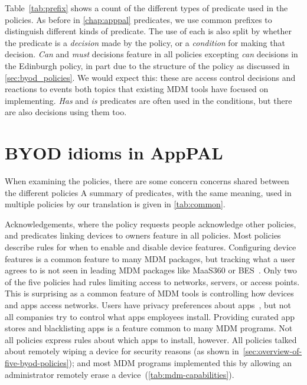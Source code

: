\documentclass[thesis.tex]{subfiles}
\begin{document}
Table~\ref{tab:prefix} shows a count of the different types of
predicate used in the policies.  As before in \autoref{chap:apppal}
predicates, we use common prefixes to distinguish different kinds of
predicate.  The use of each is also split by whether the predicate is
a \emph{decision} made by the policy, or a \emph{condition} for making
that decision. \emph{Can} and \emph{must} decisions feature in all
policies excepting \emph{can} decisions in the Edinburgh policy, in
part due to the structure of the policy as discussed in
\autoref{sec:byod_policies}. We would expect this: these are access
control decisions and reactions to events both topics that existing
\ac{MDM} tools have focused on implementing. \emph{Has} and \emph{is}
predicates are often used in the conditions, but there are also
decisions using them too.

\section{BYOD idioms in AppPAL}
\label{sec:common_concerns}

When examining the policies, there are some concern concerns shared
between the different policies A summary of predicates, with the same
meaning, used in multiple policies by our translation is given in
\autoref{tab:common}.

Acknowledgements, where the policy requests people acknowledge other
policies, and predicates linking devices to owners feature in all
policies.  Most policies describe rules for when to enable and disable
device features.  Configuring device features is a common feature to
many \ac{MDM} packages, but tracking what a user agrees to is not seen
in leading \ac{MDM} packages like MaaS360 or
BES~\cite{rob_smith_magic_2016}.  Only two of the five policies had
rules limiting access to networks, servers, or access points. This is
surprising as a common feature of \ac{MDM} tools is controlling how
devices and apps access networks.  Users have privacy preferences
about apps~\cite{lin_modeling_2014}, but not all companies try to
control what apps employees install.  Providing curated app stores and
blacklisting apps is a feature common to many \ac{MDM} programs.  Not
all policies express rules about which apps to install, however.  All
policies talked about remotely wiping a device for security reasons
(as shown in~\autoref{sec:overview-of-five-byod-policies}); and most
\ac{MDM} programs implemented this by allowing an administrator
remotely erase a device~(\autoref{tab:mdm-capabilities}).
\end{document}

